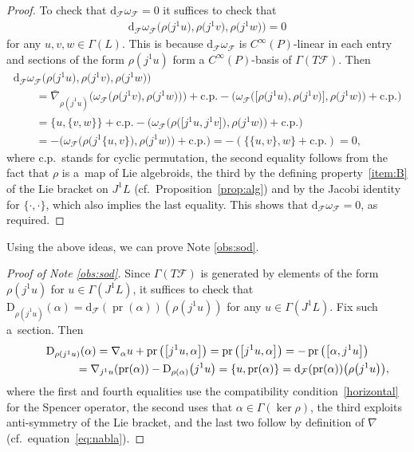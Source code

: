 \documentclass[pdftex]{sigma}
\numberwithin{equation}{section}
\newcommand{\pr}{\operatorname{pr}}
\newcommand{\de}{\mathrm{d}} %
\begin{document}
\begin{proof}
 To check that $\de_{\mathcal{F}}\omega_{\mathcal{F}} =0$ it suf\/f\/ices to check that
 \begin{gather*}
 \de_{\mathcal{F}}\omega_{\mathcal{F}}\big(\rho\big(j^1u\big),\rho\big(j^1v\big),\rho\big(j^1w\big)\big) =0
 \end{gather*}
for any $u,v,w \in \Gamma(L)$. This is because $\de_{\mathcal{F}}\omega_{\mathcal{F}}$ is $C^{\infty}(P)$-linear in each entry and sections of the form $\rho(j^1u)$ form a $C^{\infty}(P)$-basis of $\Gamma(T \mathcal{F})$. Then
 \begin{gather*}
\de_{\mathcal{F}}\omega_{\mathcal{F}}\big(\rho\big(j^1u\big),\rho\big(j^1v\big),\rho\big(j^1w\big)\big)\\
\qquad {} = \bar{\nabla}_{\rho(j^1u)}\big(\omega_{\mathcal{F}}\big(\rho\big(j^1v\big),\rho\big(j^1w\big)\big)\big)+ \mathrm{c.p.}
 - \big(\omega_{\mathcal{F}}\big(\big[\rho\big(j^1u\big),\rho\big(j^1v\big)\big],\rho\big(j^1w\big)\big) + \mathrm{c.p.}\big)\\
 \qquad{} = \{u,\{v,w\}\} + \mathrm{c.p.} - \big(\omega_{\mathcal{F}}\big(\rho\big(\big[j^1u,j^1v\big]\big), \rho\big(j^1w\big)\big) + \mathrm{c.p.}\big) \\
 \qquad {} = -\big(\omega_{\mathcal{F}}\big(\rho\big(j^1\{u,v\}\big),\rho\big(j^1w\big)\big) + \mathrm{c.p.}\big) =-(\{\{u,v\},w\} + \mathrm{c.p.}) = 0,
 \end{gather*}
where c.p.\ stands for cyclic permutation, the second equality follows from the fact that $\rho$ is a~map of Lie algebroids, the third by the def\/ining property~\ref{item:B} of the Lie bracket on $J^1 L$ (cf.\ Proposition~\ref{prop:alg}) and by the Jacobi identity for $\{\cdot,\cdot\}$, which also implies the last equality. This shows that $\de_{\mathcal{F}}\omega_{\mathcal{F}} = 0$, as required.
\end{proof}

Using the above ideas, we can prove Note \ref{obs:sod}.

\begin{proof}[Proof of Note \ref{obs:sod}]
Since $\Gamma(T\mathcal{F})$ is generated by elements of the form $\rho(j^1u)$ for $u \in \Gamma(J^1L)$, it suf\/f\/ices to check that $\mathrm{D}_{\rho(j^1u)}(\alpha) = \de_{\mathcal{F}}(\pr(\alpha))(\rho (j^1u))$ for any $u \in \Gamma(J^1L)$. Fix such a~section. Then
\begin{gather*}
 \mathrm{D}_{\rho(j^1u)}(\alpha) = \nabla_{\alpha} u + \pr\big(\big[j^1u,\alpha\big]\big) = \pr\big(\big[j^1u,\alpha\big]\big) = - \pr\big(\big[\alpha,j^1u\big]\big) \\
\hphantom{\mathrm{D}_{\rho(j^1u)}(\alpha)}{} = \nabla_{j^1u}(\pr(\alpha)) - \mathrm{D}_{\rho(\alpha) }\big(j^1u\big)
 = \{u,\pr(\alpha)\} = \de_{\mathcal{F}} (\pr(\alpha) )\big(\rho\big(j^1u\big)\big),
 \end{gather*}
where the f\/irst and fourth equalities use the compatibility condition~\eqref{horizontal} for the Spencer operator, the second uses that $\alpha \in \Gamma(\ker \rho)$, the third exploits anti-symmetry of the Lie bracket, and the last two follow by def\/inition of $\nabla$ (cf.\ equation~\eqref{eq:nabla}).
\end{proof}
\end{document}
